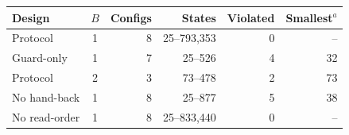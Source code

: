 
\begin{tabular}{@{}lcrrrr@{}}
\toprule
Design & $B$ & Configs & States & Violated & Smallest$^a$ \\
\midrule
Protocol & 1 & 8 & 25--793,353 & 0 & -- \\
Guard-only & 1 & 7 & 25--526 & 4 & 32 \\
Protocol & 2 & 3 & 73--478 & 2 & 73 \\
No hand-back & 1 & 8 & 25--877 & 5 & 38 \\
No read-order & 1 & 8 & 25--833,440 & 0 & -- \\
\bottomrule
\end{tabular}
